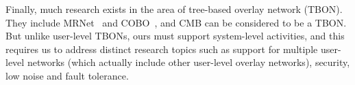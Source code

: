 %
Finally, much research exists in the area of tree-based overlay network (TBON). 
They include MRNet~\cite{mrnet} and COBO~\cite{launchmon}, and 
CMB can be considered to be a TBON. But unlike user-level
TBONs, ours must support system-level activities, and this 
requires us to address distinct research topics
such as support for multiple user-level networks (which actually
include other user-level overlay networks), security, low noise 
and fault tolerance. 

